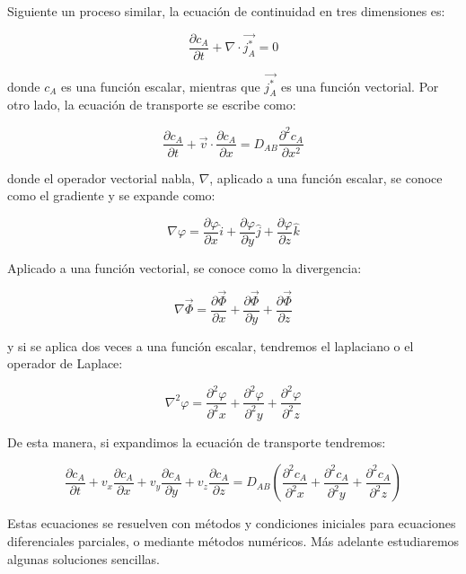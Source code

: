 \documentclass[11pt]{article}
\begin{document}
Siguiente un proceso similar, la ecuación de continuidad en tres dimensiones es:

\[ \boxed{ \frac{ \partial c_A }{ \partial t } + \nabla \cdot \overrightarrow{ j_A^* } = 0 } \]

donde \( c_A \) es una función escalar, mientras que \( \overrightarrow{ j_A^* } \) es una función vectorial. Por otro lado, la ecuación de transporte se escribe como:

\[ \boxed{ \frac{ \partial c_A }{ \partial t } + \overrightarrow v \cdot \frac{ \partial c_A }{ \partial x } = D_{AB} \frac{ \partial ^2 c_A }{ \partial x^2 } } \]

donde el operador vectorial nabla, \( \nabla \), aplicado a una función escalar, se conoce como el gradiente y se expande como:

\[ \nabla \varphi = \frac{ \partial \varphi }{ \partial x } \hat i + \frac{ \partial \varphi }{ \partial y } \hat j + \frac{ \partial \varphi }{ \partial z } \hat k \]

Aplicado a una función vectorial, se conoce como la divergencia:

\[ \nabla \overrightarrow \Phi = \frac{ \partial \overrightarrow \Phi }{ \partial x } + \frac{ \partial \overrightarrow \Phi }{ \partial y } + \frac{ \partial \overrightarrow \Phi }{ \partial z } \]

y si se aplica dos veces a una función escalar, tendremos el laplaciano o el operador de Laplace:

\[ \nabla ^2 \varphi = \frac{ \partial ^2 \varphi }{ \partial ^2 x } + \frac{ \partial ^2 \varphi }{ \partial ^2 y } + \frac{ \partial ^2 \varphi }{ \partial ^2 z } \]

De esta manera, si expandimos la ecuación de transporte tendremos:

\[ \frac{ \partial c_A }{ \partial t } + v_x \frac{ \partial c_A }{ \partial x } + v_y \frac{ \partial c_A }{ \partial y } + v_z \frac{ \partial c_A }{ \partial z } = D_{AB} \left( \frac{ \partial ^2 c_A }{ \partial ^2 x } + \frac{ \partial ^2 c_A }{ \partial ^2 y } + \frac{ \partial ^2 c_A }{ \partial ^2 z } \right) \]

Estas ecuaciones se resuelven con métodos y condiciones iniciales para ecuaciones diferenciales parciales, o mediante métodos numéricos. Más adelante estudiaremos algunas soluciones sencillas.

\end{document}
